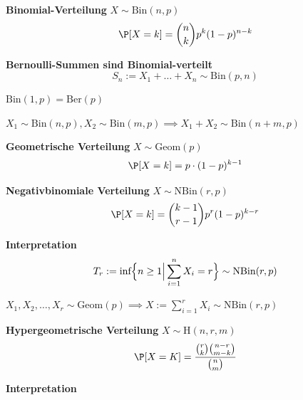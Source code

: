 \textbf{Binomial-Verteilung} $X \sim \text{Bin}(n,p)$\\
$$
    \P[X=k] = \binom{n}{k}p^k(1-p)^{n-k}
$$

\theorem \textbf{Bernoulli-Summen sind Binomial-verteilt}
$$
    S_n := X_1 + \ldots + X_n \sim \text{Bin}(p, n)
$$

\scriptsize
\lemma $\text{Bin}(1,p) = \text{Ber}(p)$

\lemma $X_1 \sim \text{Bin}(n, p), X_2 \sim \text{Bin}(m, p) \implies X_1 + X_2 \sim \text{Bin}(n+m,p)$

\normalsize

 \textbf{Geometrische Verteilung} $X \sim \text{Geom}(p)$\\
$$
    \P[X=k] = p\cdot(1-p)^{k-1}
$$

 \textbf{Negativbinomiale Verteilung} $X \sim \text{NBin}(r,p)$\\
$$
    \P[X = k] = \binom{k-1}{r-1}p^r(1-p)^{k-r}
$$

\theorem \textbf{Interpretation}\\
$$
    T_r := \text{inf}\Bigl\{ n \geq 1 \Big| \sum_{i=1}^{n}X_i=r \Bigr\} \sim \text{NBin}(r,p)
$$

\scriptsize

\lemma $X_1,X_2,\ldots,X_r \sim \text{Geom}(p) \implies X := \sum_{i=1}^{r}X_i \sim \text{NBin}(r,p)$

\normalsize


\newpage

 \textbf{Hypergeometrische Verteilung} $X \sim \text{H}(n, r, m)$
$$
    \P[X = K] = \frac{\binom{r}{k}\binom{n-r}{m-k}}{\binom{n}{m}}
$$

\theorem \textbf{Interpretation}\\
\\

